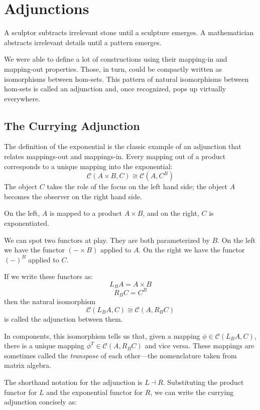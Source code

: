 \documentclass[DaoFP]{subfiles}
\begin{document}
\setcounter{chapter}{9}

\chapter{Adjunctions}

A sculptor subtracts irrelevant stone until a sculpture emerges. A mathematician abstracts irrelevant details until a pattern emerges.

We were able to define a lot of constructions using their mapping-in and mapping-out properties. Those, in turn, could be compactly written as isomorphisms between hom-sets. This pattern of natural isomorphisms between hom-sets is called an adjunction and, once recognized, pops up virtually everywhere.

\section{The Currying Adjunction}

The definition of the exponential is the classic example of an adjunction that relates mappings-out and mappings-in. Every mapping out of a product corresponds to a unique mapping into the exponential:
\[  \mathcal{C}(A \times B, C ) \cong  \mathcal{C} (A, C^B)  \]
The object $C$ takes the role of the focus on the left hand side; the object $A$ becomes the observer on the right hand side. 

On the left, $A$ is mapped to a product $A \times B$, and on the right, $C$ is exponentiated. 

We can spot two functors at play. They are both parameterized by $B$. On the left we have the functor $(- \times B)$ applied to $A$. On the right we have the functor $(-)^B$ applied to $C$. 

If we write these functors as:
\[ L_B A = A \times B \]
\[ R_B C = C^B \]
then the natural isomorphism
\[ \mathcal{C}(L_B A, C) \cong \mathcal{C}(A, R_B C) \]
is called the adjunction between them. 

In components, this isomorphism tells us that, given a mapping $\phi \in \mathcal{C}(L_B A, C)$, there is a unique mapping $\phi^T \in \mathcal{C}(A, R_B C)$ and vice versa. These mappings are sometimes called the \emph{transpose} of each other---the nomenclature taken from matrix algebra.

The shorthand notation for the adjunction is $L \dashv R$. Substituting the product functor for $L$ and the exponential functor for $R$, we can write the currying adjunction concisely as:
\end{document}
